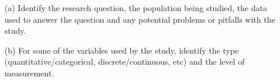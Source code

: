 \documentclass{article}
\begin{document}
\begin{flushleft}
\begin{itemize}
\item [(a)] Identify the research question, the population being studied, the data used to answer the question and any potential problems or pitfalls with the study.
\vspace{2.5in}
\item[(b)] For some of the variables used by the study, identify the type (quantitative/categorical, discrete/continuous, etc) and the level of measurement.
\end{itemize}
\end{flushleft}
\end{document}
